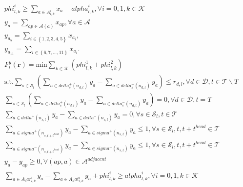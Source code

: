 \begin{align}
  & \mathit{phi}_{l , k}^{i} \geq \sum_{a \in A_{l , k}^{i}} x_{a} - \mathit{alpha}_{l , k}^{i} , \forall i = 0 , 1 , k \in \mathcal{K} \tag{eq\_0046} \\
  & y_{a} = \sum_{ap \in \mathcal{A} \left(a\right)} x_{ap} , \forall a \in \mathcal{A} \tag{eq\_0049} \\
  & y_{a_{5}} = \sum_{i \in \left\{1 , 2 , 3 , 4 , 5\right\}} x_{a_{i}} , \tag{eq\_0050} \\
  & y_{a_{11}} = \sum_{i \in \left\{6 , 7 , \ldots , 11\right\}} x_{a_{i}} . \tag{eq\_0051} \\
  & F_{l}^{y} \left(\mathbf{r}\right) = \text{min} \sum_{k \in \mathcal{K}} \left(\mathit{phi}_{l , k}^{1} + \mathit{phi}_{l , k}^{2}\right) \tag{eq\_0052} \\
  & \text{s}.\text{t}. \sum_{s \in \mathcal{S}_{l}} \left(\sum_{a \in \mathit{delta}_{s}^{+} \left(n_{d , t}\right)} y_{a} - \sum_{a \in \mathit{delta}_{s}^{-} \left(n_{d , t}\right)} y_{a}\right) \leq r_{d , l} , \forall d \in \mathcal{D} , t \in \mathcal{T} \backslash T \tag{eq\_0054} \\
  & \sum_{s \in \mathcal{S}_{l}} \left(\sum_{a \in \mathit{delta}_{s}^{+} \left(n_{d , t}\right)} y_{a} - \sum_{a \in \mathit{delta}_{s}^{-} \left(n_{d , t}\right)} y_{a}\right) = 0 , \forall d \in \mathcal{D} , t = T \tag{eq\_0055} \\
  & \sum_{a \in \mathit{delta}^{+} \left(n_{s , t}\right)} y_{a} - \sum_{a \in \mathit{delta}^{-} \left(n_{s , t}\right)} y_{a} = 0 , \forall s \in \mathcal{S}_{l} , t \in \mathcal{T} \tag{eq\_0056} \\
  & \underset{a \in \mathit{sigma}^{+} \left(n_{s , t + t^{h e a d}}\right)}{\sum} y_{a} - \sum_{a \in \mathit{sigma}^{+} \left(n_{s , t}\right)} y_{a} \leq 1 , \forall s \in \mathcal{S}_{l} , t , t + t^{h e a d} \in \mathcal{T} \tag{eq\_0057} \\
  & \underset{a \in \mathit{sigma}^{-} \left(n_{s , t + t^{h e a d}}\right)}{\sum} y_{a} - \sum_{a \in \mathit{sigma}^{-} \left(n_{s , t}\right)} y_{a} \leq 1 , \forall s \in \mathcal{S}_{l} , t , t + t^{h e a d} \in \mathcal{T} \tag{eq\_0058} \\
  & y_{a} - y_{ap} \geq 0 , \forall \left(ap , a\right) \in \mathcal{A}^{a d j a c e n t} \tag{eq\_0059} \\
  & \sum_{a \in A_bar_{l , k}^{i}} y_{a} - \sum_{a \in A_hat_{l , k}^{i}} y_{a} + \mathit{phi}_{l , k}^{i} \geq \mathit{alpha}_{l , k}^{i} , \forall i = 0 , 1 , k \in \mathcal{K} \tag{eq\_0060} \\

\end{align}
